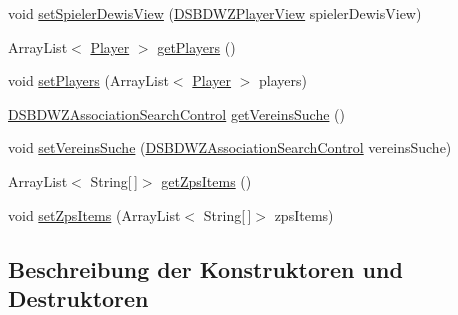 \begin{DoxyCompactItemize}
\item 
void \hyperlink{classde_1_1turnierverwaltung_1_1control_1_1_d_s_b_d_w_z_control_ae2757fdf85d4bc0908befa3525c497d2}{set\+Spieler\+Dewis\+View} (\hyperlink{classde_1_1turnierverwaltung_1_1view_1_1_d_s_b_d_w_z_player_view}{D\+S\+B\+D\+W\+Z\+Player\+View} spieler\+Dewis\+View)
\item 
Array\+List$<$ \hyperlink{classde_1_1turnierverwaltung_1_1model_1_1_player}{Player} $>$ \hyperlink{classde_1_1turnierverwaltung_1_1control_1_1_d_s_b_d_w_z_control_a85ab1424ebe68e1036e350624d9455c5}{get\+Players} ()
\item 
void \hyperlink{classde_1_1turnierverwaltung_1_1control_1_1_d_s_b_d_w_z_control_a07cf93fa5b566910adc871fcc41f66b5}{set\+Players} (Array\+List$<$ \hyperlink{classde_1_1turnierverwaltung_1_1model_1_1_player}{Player} $>$ players)
\item 
\hyperlink{classde_1_1turnierverwaltung_1_1control_1_1_d_s_b_d_w_z_association_search_control}{D\+S\+B\+D\+W\+Z\+Association\+Search\+Control} \hyperlink{classde_1_1turnierverwaltung_1_1control_1_1_d_s_b_d_w_z_control_aaa7659d3c4800185224f0047b5c4abfb}{get\+Vereins\+Suche} ()
\item 
void \hyperlink{classde_1_1turnierverwaltung_1_1control_1_1_d_s_b_d_w_z_control_a29e8f6691a54e20d5c58935823d481eb}{set\+Vereins\+Suche} (\hyperlink{classde_1_1turnierverwaltung_1_1control_1_1_d_s_b_d_w_z_association_search_control}{D\+S\+B\+D\+W\+Z\+Association\+Search\+Control} vereins\+Suche)
\item 
Array\+List$<$ String\mbox{[}$\,$\mbox{]}$>$ \hyperlink{classde_1_1turnierverwaltung_1_1control_1_1_d_s_b_d_w_z_control_a5d558fb11323c2881201686f2766691a}{get\+Zps\+Items} ()
\item 
void \hyperlink{classde_1_1turnierverwaltung_1_1control_1_1_d_s_b_d_w_z_control_ac808d6b41a42b257441c86b62ddd4213}{set\+Zps\+Items} (Array\+List$<$ String\mbox{[}$\,$\mbox{]}$>$ zps\+Items)
\end{DoxyCompactItemize}


\subsection{Beschreibung der Konstruktoren und Destruktoren}
